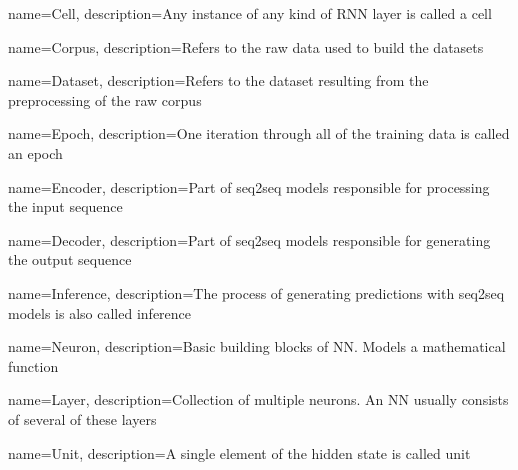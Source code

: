 
{
	name={Cell},
	description={Any instance of any kind of RNN layer is called a cell}
}

{
	name={Corpus},
	description={Refers to the raw data used to build the datasets}
}

{
	name={Dataset},
	description={Refers to the dataset resulting from the preprocessing of the raw corpus}
}

{
  name={Epoch},
  description={One iteration through all of the training data is called an epoch}
}

{
	name={Encoder},
	description={Part of seq2seq models responsible for processing the input sequence}
}

{
	name={Decoder},
	description={Part of seq2seq models responsible for generating the output sequence}
}

{
	name={Inference},
	description={The process of generating predictions with seq2seq models is also called inference}
}

{
  name={Neuron},
  description={Basic building blocks of NN. Models a mathematical function}
}

{
  name={Layer},
  description={Collection of multiple neurons. An NN usually consists of several of these layers}
}

{
	name={Unit},
	description={A single element of the hidden state is called unit}
}


